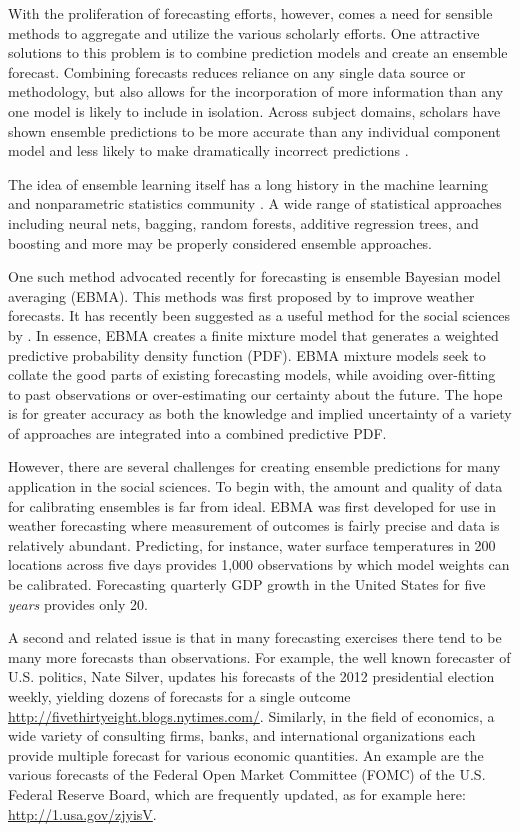 \documentclass[12pt,fullpage,endnotes]{article}
\begin{document}
With the proliferation of forecasting efforts, however, comes a need
for sensible methods to aggregate and utilize the various scholarly
efforts.  One attractive solutions to this problem is to combine
prediction models and create an ensemble forecast.  Combining
forecasts reduces reliance on any single data source or methodology,
but also allows for the incorporation of more information than any one
model is likely to include in isolation.  Across subject domains,
scholars have shown ensemble predictions to be more accurate than any
individual component model and less likely to make dramatically
incorrect predictions \citep{Bates:1969,Armstrong:2001,Raftery:2005}.

The idea of ensemble learning itself has a long history in the machine
learning and nonparametric statistics community \citet{Hastie:2009}. A
wide range of statistical approaches including neural nets, bagging,
random forests, additive regression trees, and boosting and more may
be properly considered ensemble approaches.

One such method advocated recently for forecasting is ensemble
Bayesian model averaging (EBMA). This methods was first proposed by
\citet{Raftery:2005} to improve weather forecasts.  It has recently
been suggested as a useful method for the social sciences by
\citet{mhw:2012}. In essence, EBMA creates a finite mixture model that
generates a weighted predictive probability density function (PDF).
EBMA mixture models seek to collate the good parts of existing
forecasting models, while avoiding over-fitting to past observations
or over-estimating our certainty about the future.  The hope is for
greater accuracy as both the knowledge and implied uncertainty of a
variety of approaches are integrated into a combined predictive PDF.

However, there are several challenges for creating ensemble
predictions for many application in the social sciences.  To begin
with, the amount and quality of data for calibrating ensembles is far
from ideal.  EBMA was first developed for use in weather forecasting
where measurement of outcomes is fairly precise and data is relatively
abundant.  Predicting, for instance, water surface temperatures in 200
locations across five days provides 1,000 observations by which model
weights can be calibrated.  Forecasting quarterly GDP growth in the
United States for five \textit{years} provides only 20.

A second and related issue is that in many forecasting exercises there
tend to be many more forecasts than observations.  For example, the
well known forecaster of U.S. politics, Nate Silver, updates his
forecasts of the 2012 presidential election weekly, yielding dozens of
forecasts for a single outcome
\url{http://fivethirtyeight.blogs.nytimes.com/}.  Similarly, in the
field of economics, a wide variety of consulting firms, banks, and
international organizations each provide multiple forecast for various
economic quantities. An example are the various forecasts of the
Federal Open Market Committee (FOMC) of the U.S. Federal Reserve
Board, which are frequently updated, as for example here:
\url{http://1.usa.gov/zjyisV}.
\end{document}
